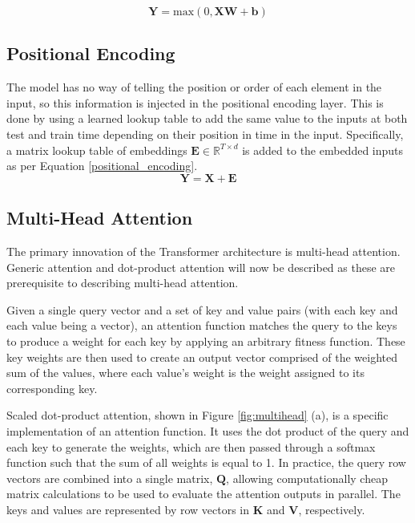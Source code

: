 \documentclass[conference]{IEEEtran}
\begin{document}
\begin{equation} \label{dense_layer}
\boldsymbol{Y} = \text{max}(0, \boldsymbol{XW} + \boldsymbol{b})
\end{equation}

\subsection{Positional Encoding}
The model has no way of telling the position or order of each element in the input, so this information is injected in the positional encoding layer.
This is done by using a learned lookup table to add the same value to the inputs at both test and train time depending on their position in time in the input.
Specifically, a matrix lookup table of embeddings $\boldsymbol{E} \in \mathbb{R}^{T \times d}$ is added to the embedded inputs as per Equation \ref{positional_encoding}.
\begin{equation}\label{positional_encoding}
\boldsymbol{Y} = \boldsymbol{X} + \boldsymbol{E}
\end{equation}

\subsection{Multi-Head Attention} \label{multihead_attention}
The primary innovation of the Transformer architecture is multi-head attention.
Generic attention and dot-product attention will now be described as these are prerequisite to describing multi-head attention.

Given a single query vector and a set of key and value pairs (with each key and each value being a vector), an attention function matches the query to the keys to produce a weight for each key by applying an arbitrary fitness function.
These key weights are then used to create an output vector comprised of the weighted sum of the values, where each value's weight is the weight assigned to its corresponding key. 

Scaled dot-product attention, shown in Figure \ref{fig:multihead} (a), is a specific implementation of an attention function. 
It uses the dot product of the query and each key to generate the weights, which are then passed through a softmax function such that the sum of all weights is equal to 1.
In practice, the query row vectors are combined into a single matrix, $\boldsymbol{Q}$, allowing computationally cheap matrix calculations to be used to evaluate the attention outputs in parallel.
The keys and values are represented by row vectors in $\boldsymbol{K}$ and $\boldsymbol{V}$, respectively.
\end{document}
